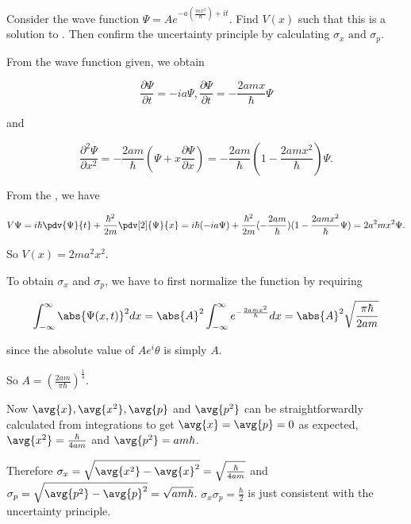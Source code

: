 \documentclass[a4paper,12pt]{report}
\begin{document}
{Consider the wave function \(\Psi = Ae^{-a(\frac{mx^2}{\hbar}) + it}\). Find \(V(x)\) such that this is a solution to \screq. Then confirm the uncertainty principle by calculating \(\sigma_x \text { and }  \sigma_p\).}
{From the wave function given, we obtain
			
\begin{equation}
  \frac{\partial \Psi }{\partial t} = -ia\Psi , \frac{\partial \Psi }{\partial t} = -\frac{2amx}{\hbar }\Psi    
\end{equation}

and
		
\begin{equation}
  \frac{\partial^2 \Psi }{\partial x^2} = -\frac{2am}{\hbar }(\Psi + x\frac{\partial \Psi }{\partial x} ) = -\frac{2am}{\hbar }(1-\frac{2amx^2 }{\hbar } )\Psi .  
\end{equation}
		
From the \screq, we have 
		
\begin{equation}
  V\Psi = i\hbar\pdv{\Psi}{t} + \frac{\hbar^2}{2m}\pdv[2]{\Psi}{x} = i\hbar(-ia\Psi) + \frac{\hbar^2}{2m}(-\frac{2am}{\hbar})(1-\frac{2amx^2}{\hbar}\Psi) = 2a^2mx^2\Psi.
\end{equation}
		
		
So \(V(x) = 2ma^2x^2\).
		
To obtain \(\sigma_x\) and \(\sigma_p\), we have to first normalize the function by requiring

\begin{equation}
  \int_{-\infty}^{\infty} \abs{\Psi (x,t)}^2 dx = \abs{A} ^2  \int_{-\infty}^{\infty} e^{-\frac{2amx^2 }{\hbar } } dx = \abs{A} ^2 \sqrt{\frac{\pi \hbar }{2am} }     
\end{equation}

since the absolute value of \(Ae^i\theta\) is simply \(A\).
		
So \(A = (\frac{2am}{\pi\hbar})^{\frac{1}{4} }\).
		
Now \(\avg{x}, \avg{x^2}, \avg{p}\) and \(\avg{p^2}\) can be straightforwardly calculated from integrations to get \(\avg{x} = \avg{p} = 0\) as expected, \( \avg{x^2} = \frac{\hbar}{4am}\) and \(\avg{p^2} = am\hbar\).
		
Therefore \(\sigma_x = \sqrt{\avg{x^2} - \avg{x}^2} = \sqrt{\frac{\hbar}{4am}}\) and \(\sigma_p = \sqrt{\avg{p^2} - \avg{p}^2} = \sqrt{am\hbar}\). \(\sigma_x \sigma_p = \frac{\hbar}{2}\) is just consistent with the uncertainty principle.}
\end{document}
